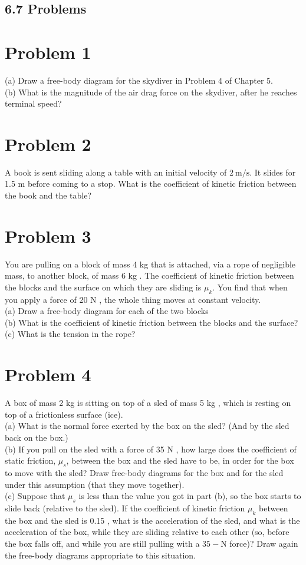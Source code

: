 \documentclass[10pt]{article}
\begin{document}
\subsection*{6.7 Problems}
\section*{Problem 1}
(a) Draw a free-body diagram for the skydiver in Problem 4 of Chapter 5.\\
(b) What is the magnitude of the air drag force on the skydiver, after he reaches terminal speed?

\section*{Problem 2}
A book is sent sliding along a table with an initial velocity of $2 \mathrm{~m} / \mathrm{s}$. It slides for 1.5 m before coming to a stop. What is the coefficient of kinetic friction between the book and the table?

\section*{Problem 3}
You are pulling on a block of mass 4 kg that is attached, via a rope of negligible mass, to another block, of mass 6 kg . The coefficient of kinetic friction between the blocks and the surface on which they are sliding is $\mu_{k}$. You find that when you apply a force of 20 N , the whole thing moves at constant velocity.\\
(a) Draw a free-body diagram for each of the two blocks\\
(b) What is the coefficient of kinetic friction between the blocks and the surface?\\
(c) What is the tension in the rope?

\section*{Problem 4}
A box of mass 2 kg is sitting on top of a sled of mass 5 kg , which is resting on top of a frictionless surface (ice).\\
(a) What is the normal force exerted by the box on the sled? (And by the sled back on the box.)\\
(b) If you pull on the sled with a force of 35 N , how large does the coefficient of static friction, $\mu_{s}$, between the box and the sled have to be, in order for the box to move with the sled? Draw free-body diagrams for the box and for the sled under this assumption (that they move together).\\
(c) Suppose that $\mu_{s}$ is less than the value you got in part (b), so the box starts to slide back (relative to the sled). If the coefficient of kinetic friction $\mu_{k}$ between the box and the sled is 0.15 , what is the acceleration of the sled, and what is the acceleration of the box, while they are sliding relative to each other (so, before the box falls off, and while you are still pulling with a $35-\mathrm{N}$ force)? Draw again the free-body diagrams appropriate to this situation.
\end{document}
